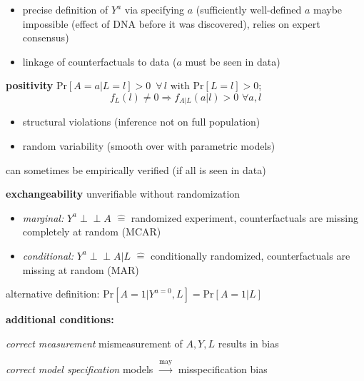 \documentclass[8pt]{extarticle}
\newcommand{\indep}{\perp \!\!\! \perp}
\begin{document}
\begin{multicols}{2}
\begin{itemize}[itemsep=0em, topsep=0pt, partopsep=0pt,parsep=0pt, leftmargin=1.5em]
\setlength{\itemsep}{0pt}%
\setlength{\parskip}{0pt}
\item precise definition of $Y^a$ via specifying $a$ (sufficiently well-defined $a$ maybe impossible (effect of DNA before it was discovered), relies on expert consensus)
\item linkage of counterfactuals to data ($a$ must be seen in data) 
\end{itemize}

\noindent \textbf{positivity} $\mathrm{Pr}\left[A=a|L=l\right] >0 \,\,\, \forall \, l \text{ with } \mathrm{Pr}\left[L=l\right]>0$; $$f_L(l)\neq 0 \Rightarrow f_{A|L}(a|l)>0 \,\, \forall a,l$$

\begin{itemize}[itemsep=0em, topsep=0pt, partopsep=0pt,parsep=0pt, leftmargin=1.5em]
\setlength{\itemsep}{0pt}%
\setlength{\parskip}{0pt}
\item structural violations (inference not on full population)
\item random variability (smooth over with parametric models)
\end{itemize}
\noindent can sometimes be empirically verified (if all is seen in data)

\noindent \textbf{exchangeability} unverifiable without randomization
\begin{itemize}[itemsep=0em, topsep=0pt, partopsep=0pt,parsep=0pt, leftmargin=1.5em]
\setlength{\itemsep}{0pt}%
\setlength{\parskip}{0pt}
\item \textit{marginal:} $Y^a \indep A$ $\widehat{=}$ randomized experiment, \newline counterfactuals are missing completely at random (MCAR)

\item \textit{conditional:} $Y^a {\indep} A|L$ $\widehat{=}$ conditionally randomized, counterfactuals are missing at random (MAR)
\end{itemize}
alternative definition: $ \mathrm{Pr}\left[A=1|Y^{a=0}, L\right] = \mathrm{Pr}\left[A=1|L\right]$

\noindent \textbf{additional conditions:}

\noindent \textit{correct measurement} mismeasurement of $A, Y, L$ results in bias

\noindent \textit{correct model specification} models $\overset{\text{may}}{\rightarrow}$ misspecification bias





\end{multicols}
\end{document}
